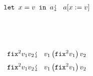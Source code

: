 \documentclass{beamer}
\newcommand{\assign}{:=}
\newcommand{\downsquigarrow}{{\mbox{\rotatebox[origin=c]{-90}{$\rightsquigarrow$}}}}
\newcommand{\tmverbatim}[1]{\text{{\ttfamily{#1}}}}
\begin{document}
{}{}{\hlopt{=}}{\hlendline{}}\\
{\hlstd{ \ }}{}{\hlopt{(}}{}{}{\hlopt{->}}{\hlendline{}}\\
{\hlstd{ \ \ \ }}{}{}{}{\hlendline{}}\\
{\hlstd{ \ \ \ \ \ }}{\hlopt{\textbar }}{}{\hlopt{->
}}{}{\hlendline{}}\\
{\hlstd{ \ \ \ \ \ }}{\hlopt{\textbar }}{}{\hlopt{(}}{}{\hlopt{, }}{}{\hlopt{) -> }}{}{\hlopt{+ }}{}{\hlopt{) }}{}{\hlendline{}}\\
{}{\hlopt{(}}{}{\hlopt{(}}{}{\hlopt{,
(}}{}{\hlopt{(}}{}{\hlopt{,
}}{}{\hlopt{))))}}{\hlendline{}}
\begin{eqnarray*}
  \text{\tmverbatim{let }} x = v \text{\tmverbatim{ in }} a & \downsquigarrow
  & a [x \assign v]
\end{eqnarray*}
{\hlstd{ \ }}{}{\hlopt{(}}{}{}{\hlopt{->}}{\hlendline{}}\\
{\hlstd{ \ \ \ }}{}{}{}{\hlendline{}}\\
{\hlstd{ \ \ \ \ \ }}{\hlopt{\textbar }}{}{\hlopt{->
}}{}{\hlendline{}}\\
{\hlstd{ \ \ \ \ \ }}{\hlopt{\textbar }}{}{\hlopt{(}}{}{\hlopt{, }}{}{\hlopt{) -> }}{}{\hlopt{+ }}{}{\hlopt{) }}{\hlopt{(}}{}{\hlopt{(}}{}{\hlopt{, (}}{}{\hlopt{(}}{}{\hlopt{, }}{}{\hlopt{))))}}
\begin{eqnarray*}
  \text{\tmverbatim{fix}}^2 v_1 v_2 & \downsquigarrow & v_1  \left(
  \text{\tmverbatim{fix}}^2 v_1 \right) v_2
\end{eqnarray*}
{\newpage}
\begin{eqnarray*}
  \text{\tmverbatim{fix}}^2 v_1 v_2 & \downsquigarrow & v_1  \left(
  \text{\tmverbatim{fix}}^2 v_1 \right) v_2
\end{eqnarray*}
{\hlstd{ \ }}{\hlopt{(}}{}{}{\hlopt{->}}{\hlendline{}}\\
{\hlstd{ \ \ \ }}{}{}{}{\hlendline{}}\\
{\hlstd{ \ \ \ \ \ }}{\hlopt{\textbar }}{}{\hlopt{->
}}{}{\hlendline{}}\\
\end{document}
